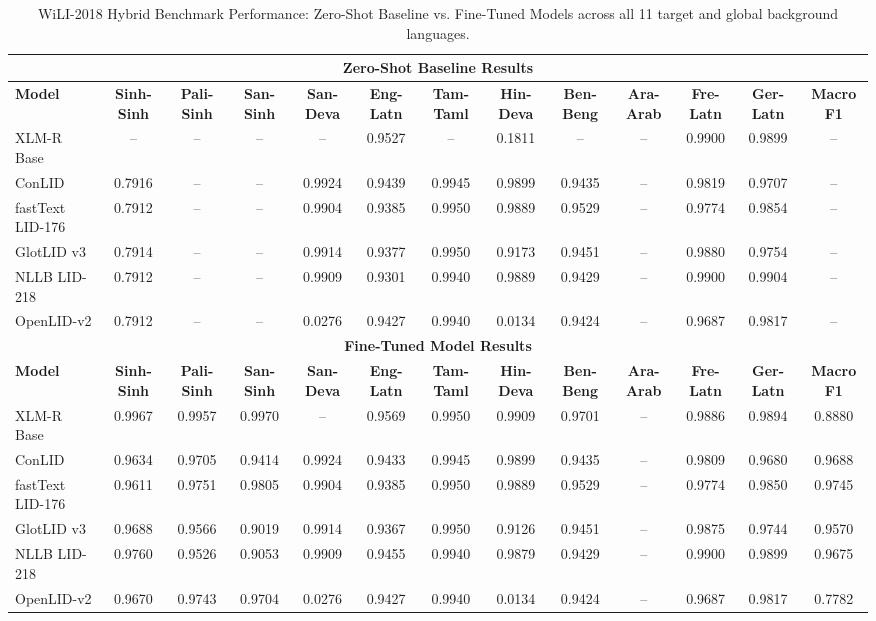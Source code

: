 \documentclass[11pt]{article}
\begin{document}
\begin{table}[p]
\vspace{12pt}

\caption{WiLI-2018 Hybrid Benchmark Performance: Zero-Shot Baseline vs. Fine-Tuned Models across all 11 target and global background languages.}
\label{tab:wili_full}
\begin{tabular}{l ccc cccccccc c}
\toprule
\multicolumn{13}{c}{\textbf{Zero-Shot Baseline Results}} \\
\midrule
\textbf{Model} & \textbf{Sinh-Sinh} & \textbf{Pali-Sinh} & \textbf{San-Sinh} & \textbf{San-Deva} & \textbf{Eng-Latn} & \textbf{Tam-Taml} & \textbf{Hin-Deva} & \textbf{Ben-Beng} & \textbf{Ara-Arab} & \textbf{Fre-Latn} & \textbf{Ger-Latn} & \textbf{Macro F1} \\
\midrule
XLM-R Base & -- & -- & -- & -- & 0.9527 & -- & 0.1811 & -- & -- & 0.9900 & 0.9899 & -- \\
ConLID & 0.7916 & -- & -- & 0.9924 & 0.9439 & 0.9945 & 0.9899 & 0.9435 & -- & 0.9819 & 0.9707 & -- \\
fastText LID-176 & 0.7912 & -- & -- & 0.9904 & 0.9385 & 0.9950 & 0.9889 & 0.9529 & -- & 0.9774 & 0.9854 & -- \\
GlotLID v3 & 0.7914 & -- & -- & 0.9914 & 0.9377 & 0.9950 & 0.9173 & 0.9451 & -- & 0.9880 & 0.9754 & -- \\
NLLB LID-218 & 0.7912 & -- & -- & 0.9909 & 0.9301 & 0.9940 & 0.9889 & 0.9429 & -- & 0.9900 & 0.9904 & -- \\
OpenLID-v2 & 0.7912 & -- & -- & 0.0276 & 0.9427 & 0.9940 & 0.0134 & 0.9424 & -- & 0.9687 & 0.9817 & -- \\
\midrule
\multicolumn{13}{c}{\textbf{Fine-Tuned Model Results}} \\
\midrule
\textbf{Model} & \textbf{Sinh-Sinh} & \textbf{Pali-Sinh} & \textbf{San-Sinh} & \textbf{San-Deva} & \textbf{Eng-Latn} & \textbf{Tam-Taml} & \textbf{Hin-Deva} & \textbf{Ben-Beng} & \textbf{Ara-Arab} & \textbf{Fre-Latn} & \textbf{Ger-Latn} & \textbf{Macro F1} \\
\midrule
XLM-R Base & 0.9967 & 0.9957 & 0.9970 & -- & 0.9569 & 0.9950 & 0.9909 & 0.9701 & -- & 0.9886 & 0.9894 & 0.8880 \\
ConLID & 0.9634 & 0.9705 & 0.9414 & 0.9924 & 0.9433 & 0.9945 & 0.9899 & 0.9435 & -- & 0.9809 & 0.9680 & 0.9688 \\
fastText LID-176 & 0.9611 & 0.9751 & 0.9805 & 0.9904 & 0.9385 & 0.9950 & 0.9889 & 0.9529 & -- & 0.9774 & 0.9850 & 0.9745 \\
GlotLID v3 & 0.9688 & 0.9566 & 0.9019 & 0.9914 & 0.9367 & 0.9950 & 0.9126 & 0.9451 & -- & 0.9875 & 0.9744 & 0.9570 \\
NLLB LID-218 & 0.9760 & 0.9526 & 0.9053 & 0.9909 & 0.9455 & 0.9940 & 0.9879 & 0.9429 & -- & 0.9900 & 0.9899 & 0.9675 \\
OpenLID-v2 & 0.9670 & 0.9743 & 0.9704 & 0.0276 & 0.9427 & 0.9940 & 0.0134 & 0.9424 & -- & 0.9687 & 0.9817 & 0.7782 \\
\bottomrule
\end{tabular}
\end{table}
\end{document}
